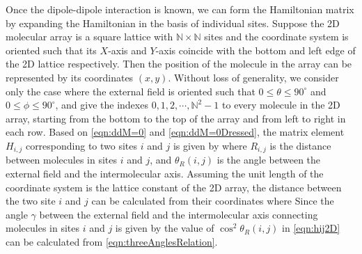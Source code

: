 Once the dipole-dipole interaction is known, we can form the Hamiltonian matrix by expanding the Hamiltonian in 
the basis of individual sites. Suppose the 2D molecular array is a square lattice with $\mathbb{N}\times\mathbb{N}$
sites and the coordinate system is oriented such that its $X$-axis and $Y$-axis coincide with the
bottom and left edge of the 2D lattice respectively. Then the position of the
molecule in the array can be represented by its coordinates $(x, y)$. Without loss of generality, we consider only 
the case where the external field is oriented such that $0\le \theta\le 90^\circ$ and $0 \le \phi \le 90^\circ$, and
give the indexes $0, 1, 2, \cdots, \mathbb{N}^2-1$ to every molecule in the 2D array, starting from the bottom to 
the top of the array and from left to right in each row. Based on \autoref{eqn:ddM=0} and
 \autoref{eqn:ddM=0Dressed},  the matrix element $H_{i,j}$ corresponding to two sites $i$ and $j$ is given by
where $R_{i,j}$ is the distance between molecules in sites $i$ and $j$, and $\theta_{R}(i,j)$ is the angle between the external field
and the intermolecular axis. Assuming the unit length of the coordinate system is the lattice constant of the 2D array,
 the distance between the two site $i$ and $j$ can be calculated from their coordinates
where
Since the angle $\gamma$ between the external field and the 
intermolecular axis connecting molecules in sites $i$ and $j$ is given by
the value of $\cos^2\theta_{R}(i,j)$ in \autoref{eqn:hij2D} can be calculated from \autoref{eqn:threeAnglesRelation}.

